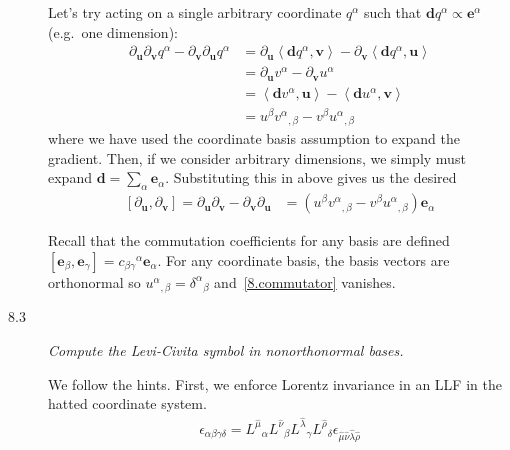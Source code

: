 \documentclass[12pt]{report}
\newcommand{\bm}[1]{\boldsymbol{\mathbf{#1}}}
\newcommand{\expvalue}[1]{\left<#1\right>}
\begin{document}
\begin{description}
        Let's try acting on a single arbitrary coordinate $q^\alpha$ such that
        $\bm{d}q^\alpha \propto \bm{e}^\alpha$ (e.g.\ one dimension):
        \begin{align*}
            \partial_{\bm{u}}\partial_{\bm{v}}q^\alpha -
                \partial_{\bm{v}}\partial_{\bm{u}}q^\alpha &=
            \partial_{\bm{u}}\expvalue{\bm{d}q^\alpha, \bm{v}} -
                \partial_{\bm{v}}\expvalue{\bm{d}q^\alpha, \bm{u}}\\
            &= \partial_{\bm{u}}v^\alpha -
                \partial_{\bm{v}}u^\alpha\\
            &= \expvalue{\bm{d}v^\alpha, \bm{u}} -
                \expvalue{\bm{d}u^\alpha, \bm{v}}\\
            &= u^\beta {v^\alpha}_{,\beta} -
                v^\beta {u^\alpha}_{,\beta}
        \end{align*}
        where we have used the coordinate basis assumption to expand the
        gradient. Then, if we consider arbitrary dimensions, we simply must expand
        $\bm{d} = \sum_\alpha \bm{e}_\alpha$. Substituting this in above gives
        us the desired
        \begin{align}
            \left[ \partial_{\bm{u}}, \partial_{\bm{v}} \right]
            = \partial_{\bm{u}}\partial_{\bm{v}} -
                \partial_{\bm{v}}\partial_{\bm{u}}
            &= \left(u^\beta {v^\alpha}_{,\beta} -
                v^\beta {u^\alpha}_{,\beta}\right)\bm{e}_\alpha
                \label{8.commutator}
        \end{align}

        Recall that the commutation coefficients for any basis are defined
        $\left[ \bm{e}_\beta, \bm{e}_\gamma \right] =
        {c_{\beta\gamma}}^\alpha \bm{e}_\alpha$. For any coordinate basis, the
        basis vectors are orthonormal so ${u^\alpha}_{,\beta} =
        {\delta^\alpha}_\beta$ and~\eqref{8.commutator} vanishes.

    \item[8.3] \emph{Compute the Levi-Civita symbol in nonorthonormal bases.}

        We follow the hints. First, we enforce Lorentz invariance in an LLF in
        the hatted coordinate system.
        \begin{align*}
            \epsilon_{\alpha\beta\gamma\delta} =
                {L^{\hat{\mu}}}_\alpha
                {L^{\hat{\nu}}}_\beta
                {L^{\hat{\lambda}}}_\gamma
                {L^{\hat{\rho}}}_\delta
                \epsilon_{\hat{\mu}\hat{\nu}\hat{\lambda}\hat{\rho}}
        \end{align*}


\end{description}
\end{document}
